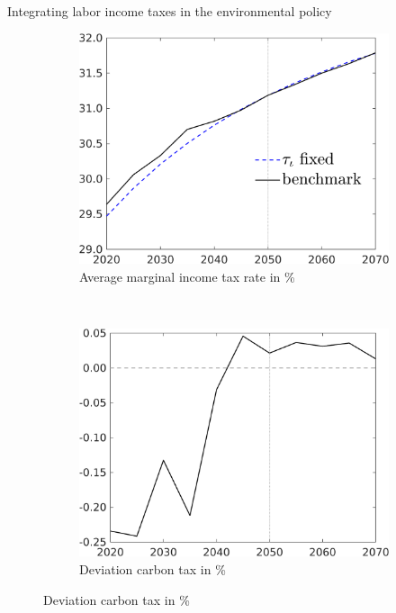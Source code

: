 \documentclass[11pt,aspectratio=169]{beamer}
\begin{document}
\begin{frame}{Integrating labor income taxes in the environmental policy}
	\pause
	\vspace{-3mm}
	\centering
	\begin{figure}[h!!]
		\centering
		
		\begin{subfigure}{0.45\textwidth}		
			\caption{{Average marginal income tax rate in \%}}
			\includegraphics[width=1\textwidth]{../codding_model/own_basedOnFried/optimalPol_010922_revision/figures/all_13Sept22/NewCalib_polTaulFixed_T_dTaulAvS_Sun2_emnet1_spillover0_knspil3_xgr0_nsk0_sep0_extern0_PV1_etaa0.79_lgd1.png}
		\end{subfigure}
		\begin{minipage}[]{0.05\textwidth}
			\
		\end{minipage}
		\begin{subfigure}{0.45\textwidth}		
			\caption{{Deviation carbon tax in \%}}
			\includegraphics[width=1\textwidth]{../codding_model/own_basedOnFried/optimalPol_010922_revision/figures/all_13Sept22/NewCalib_polTaulFixedPer_T_Tauf_Sun2_emnet1_spillover0_knspil3_xgr0_nsk0_sep0_extern0_PV1_etaa0.79.png}

\end{subfigure}
\end{figure}
\end{frame}
\end{document}
